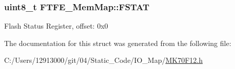 \subsubsection[{F\+S\+T\+A\+T}]{\setlength{\rightskip}{0pt plus 5cm}uint8\+\_\+t F\+T\+F\+E\+\_\+\+Mem\+Map\+::\+F\+S\+T\+A\+T}\label{struct_f_t_f_e___mem_map_a7e8a4e06df758e3dc251260d71818be8}
Flash Status Register, offset\+: 0x0 

The documentation for this struct was generated from the following file\+:\begin{DoxyCompactItemize}
\item 
C\+:/\+Users/12913000/git/04/\+Static\+\_\+\+Code/\+I\+O\+\_\+\+Map/\hyperlink{_m_k70_f12_8h}{M\+K70\+F12.\+h}\end{DoxyCompactItemize}
